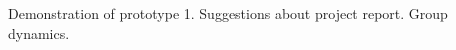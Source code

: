 \nextItem Demonstration of prototype 1.
\nextItem Suggestions about project report.
\nextItem Group dynamics.
